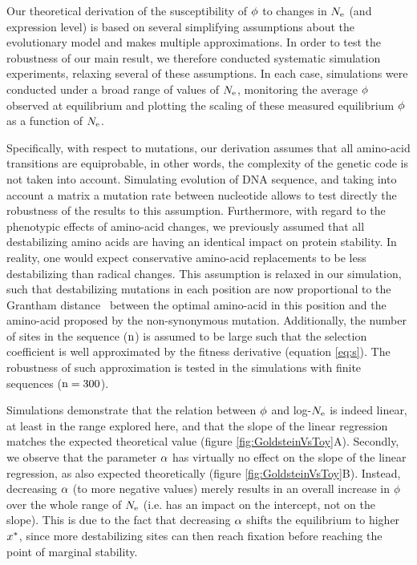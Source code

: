 Our theoretical derivation of the susceptibility of $\phi$ to changes in $N_{\mathrm{e}}$ (and expression level) is based on several simplifying assumptions about the evolutionary model and makes multiple approximations.
In order to test the robustness of our main result, we therefore conducted systematic simulation experiments, relaxing several of these assumptions.
In each case, simulations were conducted under a broad range of values of $N_{\mathrm{e}}$, monitoring the average $\phi$ observed at equilibrium and plotting the scaling of these measured equilibrium $\phi$ as a function of $N_{\mathrm{e}}$.

Specifically, with respect to mutations, our derivation assumes that all amino-acid {transitions} are equiprobable, in other words, the complexity of the genetic code is not taken into account.
Simulating evolution of \acrshort{DNA} sequence, and taking into account a matrix a mutation rate between nucleotide allows to test directly the robustness of the results to this assumption.
Furthermore, with regard to the phenotypic effects of amino-acid changes, we previously assumed that all destabilizing amino acids are having an identical impact on protein stability.
In reality, one would expect conservative amino-acid replacements to be less destabilizing than radical changes.
This assumption is relaxed in our simulation, such that destabilizing mutations in each position are now proportional to the Grantham distance~\citep{Grantham1974} between the optimal amino-acid in this position and the amino-acid proposed by the non-synonymous mutation.
Additionally, the number of sites in the sequence ($\text{n}$) is assumed to be large such that the selection coefficient is well approximated by the fitness derivative (equation \ref{eq:s}).
The robustness of such approximation is tested in the simulations with finite sequences ($\text{n}=300$).

Simulations demonstrate that the relation between $\phi$ and log-$N_{\mathrm{e}}$ is indeed linear, at least in the range explored here, and that the slope of the linear regression matches the expected theoretical value (figure \ref{fig:GoldsteinVsToy}A).
Secondly, we observe that the parameter $\alpha$ has virtually no effect on the slope of the linear regression, as also expected theoretically (figure \ref{fig:GoldsteinVsToy}B).
Instead, decreasing $\alpha$ (to more negative values) merely results in an overall increase in $\phi$ over the whole range of $N_{\mathrm{e}}$ (i.e. has an impact on the intercept, not on the slope).
This is due to the fact that decreasing $\alpha$ shifts the equilibrium to higher $x^{*}$, since more destabilizing sites can then reach fixation before reaching the point of marginal stability.

